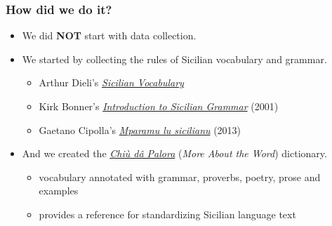 \documentclass{beamer}
\begin{document}
\begin{frame}
  \frametitle{How did we do it?}
  \begin{itemize}
  \item We did \textbf{NOT} start with data collection.
  \vspace{1em}
  \item We started by collecting the rules of Sicilian vocabulary and grammar.
    \begin{itemize}
    \item Arthur Dieli's \href{http://www.dieli.net/SicilyPage/SicilianLanguage/Vocabulary.html}{\textit{Sicilian Vocabulary}}
    \item Kirk Bonner's \href{http://www.arbasicula.org/LegasOnlineStore.html\#!/28-An-Introduction-to-Sicilian-Grammar-by-J-K-Kirk-Bonner-Edited-by-Gaetano-Cipolla/p/82865123/category=0}{\textit{Introduction to Sicilian Grammar}} (2001)
    \item Gaetano Cipolla's \href{http://www.arbasicula.org/LegasOnlineStore.html\#!/26-Learn-Sicilian-Mparamu-lu-sicilianu-by-Gaetano-Cipolla/p/82865121/category=0}{\textit{Mparamu lu sicilianu}} (2013)
    \end{itemize}
    \vspace{1em}
    \item And we created the \href{https://www.napizia.com/cgi-bin/cchiu-da-palora.pl}{\textit{Chiù dâ Palora}}
  (\textit{More About the Word}) dictionary.
    \begin{itemize}
    \item vocabulary annotated with grammar, proverbs, poetry, prose and examples
    \item provides a reference for standardizing Sicilian language text
    \end{itemize}
  \end{itemize}
\end{frame}

\end{document}
